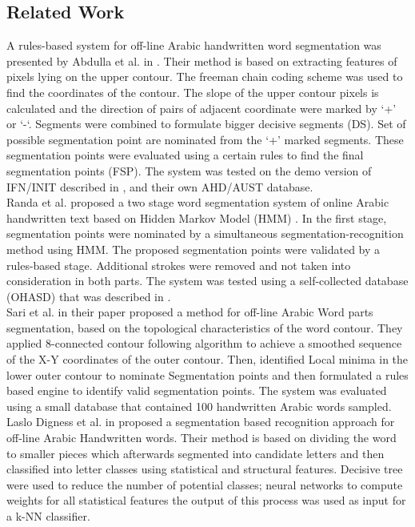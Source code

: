 \documentclass[12pt,journal,compsoc]{IEEEtran}
\begin{document}
\subsection{Related Work}
A rules-based system for off-line Arabic handwritten word segmentation was presented by Abdulla et al. in \cite{abdulla2008off}. Their method is based on extracting features of pixels lying on the upper contour. The freeman chain coding scheme was used to find the coordinates of the contour. The slope of the upper contour pixels is calculated and the direction of pairs of adjacent coordinate were marked by ‘+’ or ‘-‘. Segments were combined to formulate bigger decisive segments (DS). Set of possible segmentation point are nominated from the ‘+’ marked segments. These segmentation points were evaluated using a certain rules to find the final segmentation points (FSP). The system was tested on the demo version of IFN/INIT described in \cite{pechwitz2002ifn} , and their own AHD/AUST database.\\

Randa et al. proposed a two stage word segmentation system of online Arabic handwritten text based on Hidden Markov Model (HMM) \cite{elanwar2012unconstrained}. In the first stage, segmentation points were nominated by a simultaneous segmentation-recognition method using HMM.  The proposed segmentation points were validated by a rules-based stage. Additional strokes were removed and not taken into consideration in both parts. The system was tested using a self-collected database (OHASD) that was described in \cite{elanwar2010ohasd}.\\

Sari et al. in their paper \cite{sari2002off} proposed a method for off-line Arabic Word parts segmentation, based on the topological characteristics of the word contour. They applied 8-connected contour following algorithm to achieve a smoothed sequence of the X-Y coordinates of the outer contour. Then, identified Local minima in the lower outer contour to nominate Segmentation points and then formulated a rules based engine to identify valid segmentation points. The system was evaluated using a small database that contained 100 handwritten Arabic words sampled.\\

Laslo Digness et al. in \cite{Dinges2011} proposed a segmentation based recognition approach for off-line Arabic Handwritten words. Their method is based on dividing the word to smaller pieces which afterwards segmented into candidate letters and then classified into letter classes using statistical and structural features. Decisive tree were used to reduce the number of potential classes; neural networks to compute weights for all statistical features the output of this process was used as input for a k-NN classifier.\\
\end{document}
